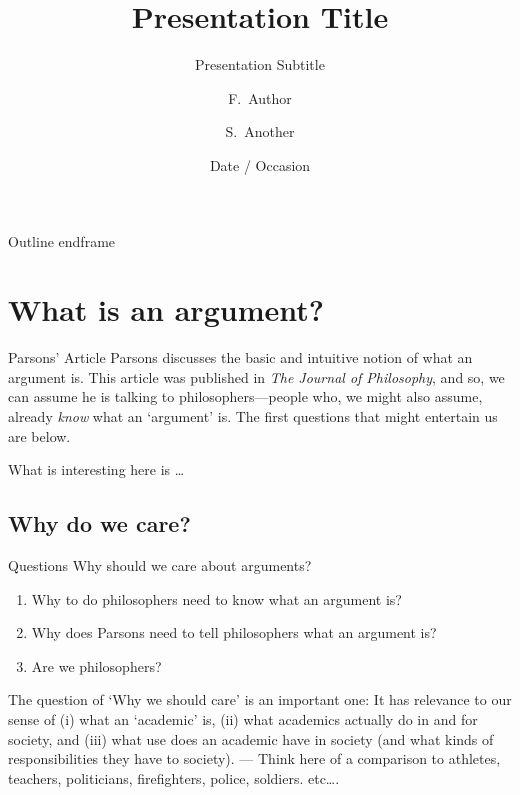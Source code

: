 \documentclass{beamer}
\title[Short Paper Title] %
{Presentation Title}
\subtitle
{Presentation Subtitle} %
\author[Author, Another] %
{F.~Author\inst{1} \and S.~Another\inst{2}}
\institute[Universities of Somewhere and Elsewhere] %
{
  \inst{1}%
  Department of Computer Science\\
  University of Somewhere
  \and
  \inst{2}%
  Department of Theoretical Philosophy\\
  University of Elsewhere}
\date[Short Occasion] %
{Date / Occasion}
\begin{document}
\begin{frame}
  \titlepage
\end{frame}

\begin{frame}{Outline}
  \tableofcontents
end{frame}

\section{What is an argument?}

\begin{frame}{Parsons' Article}
Parsons discusses the basic and intuitive notion of what an argument is. This article was published in \textsl{The Journal of Philosophy}, and so, we can assume he is talking to philosophers---people who, we might also assume, already \textsl{know} what an `argument' is. The first questions that might entertain us are below. 
\end{frame} 


What is interesting here is \ldots

\subsection{Why do we care?}
\begin{frame}{Questions}\label{whycare}
Why should we care about arguments?
\begin{enumerate}
\item Why to do philosophers need to know what an argument is?
\item Why does Parsons need to tell philosophers what an argument is? 
\item Are we philosophers?
\end{enumerate}
\end{frame}


The question of `Why we should care' is an important one: It has relevance to our sense of (i) what an `academic' is, (ii) what academics actually do in and for society, and (iii) what use does an academic have in society (and what kinds of responsibilities they have to society). --- Think here of a comparison to athletes, teachers, politicians, firefighters, police, soldiers. etc\ldots.



\end{frame}
\end{document}
